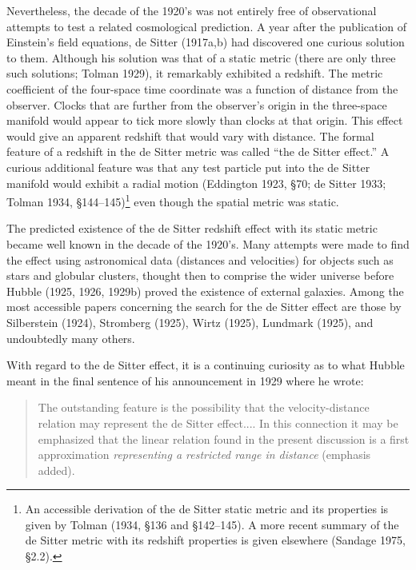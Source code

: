 \documentclass[preprint]{aastex}
\begin{document}
Nevertheless, the decade of the 1920's was not entirely free of
observational attempts to test a related cosmological prediction. A
year after the publication of Einstein's field equations, de Sitter
(1917a,b) had discovered one curious solution to them. Although his
solution was that of a static metric (there are only three such
solutions; Tolman 1929), it remarkably exhibited a redshift. The
metric coefficient of the four-space time coordinate was a function of
distance from the observer. Clocks that are further from the
observer's origin in the three-space manifold would appear to tick
more slowly than clocks at that origin. This effect would give an
apparent redshift that would vary with distance. The formal feature of
a redshift in the de Sitter metric was called ``the de Sitter
effect.''  A curious additional feature was that any test particle put
into the de Sitter manifold would exhibit a radial motion (Eddington
1923, \S 70; de Sitter 1933; Tolman 1934, \S 144--145)\footnote{An
accessible derivation of the de Sitter static metric and its
properties is given by Tolman (1934, \S 136 and \S 142--145). A more
recent summary of the de Sitter metric with its redshift properties is
given elsewhere (Sandage 1975, \S 2.2).} even though the spatial
metric was static.

The predicted existence of the de Sitter redshift effect with its
static metric became well known in the decade of the 1920's. Many
attempts were made to find the effect using astronomical data
(distances and velocities) for objects such as stars and globular
clusters, thought then to comprise the wider universe before Hubble
(1925, 1926, 1929b) proved the existence of external galaxies. Among
the most accessible papers concerning the search for the de Sitter
effect are those by Silberstein (1924), Stromberg (1925), Wirtz
(1925), Lundmark (1925), and undoubtedly many others.

With regard to the de Sitter effect, it is a continuing curiosity as
to what Hubble meant in the final sentence of his announcement in 1929
where he wrote:

\begin{quote}
The outstanding feature is the possibility that the velocity-distance
relation may represent the de Sitter effect.... In this connection it
may be emphasized that the linear relation found in the present
discussion is a first approximation {\it representing a restricted
range in distance} (emphasis added).
\end{quote}
\end{document}
